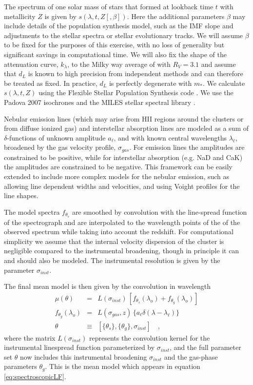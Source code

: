 \documentclass[iop,numberedappendix]{emulateapj}
\begin{document}
The spectrum of one solar mass of stars that formed at lookback time
$t$ with metallicity $Z$ is given by $s(\lambda, t, Z [, \beta])$.
Here the additional parameters $\beta$ may include details of the
population synthesis model, such as the IMF slope and adjustments to
the stellar spectra or stellar evolutionary tracks. We will assume
$\beta$ to be fixed for the purposes of this exercise, with no loss of
generality but significant savings in computational time.  We will
also fix the shape of the attenuation curve, $k_\lambda $, to the
Milky way average of \citet{CCM89} with $R_V=3.1$ and assume that
$d_L$ is known to high precision from independent methods and can
therefore be treated as fixed.  In practice, $d_L$ is perfectly
degenerate with $m_*$. We calculate $s(\lambda, t, Z)$ using the
Flexible Stellar Population Synthesis code \citep[FSPS][]{fsps}.  We
use the Padova 2007 isochrones \citep{girardi00, bertilli94, marigo07}
and the MILES stellar spectral library \citep{miles_I, miles_II,
miles_III}.

Nebular emission lines (which may arise from HII regions around the
clusters or from diffuse ionized gas) and interstellar absorption
lines are modeled as a sum of $\delta$-functions of unknown amplitude
$a_\ell$, and with known central wavelengths $\lambda_\ell$, broadened
by the gas velocity profile, $\sigma_{gas}$.  For emission lines the
amplitudes are constrained to be positive, while for interstellar
absorption (e.g. NaD and CaK) the amplitudes are constrained to be
negative. This framework can be easily extended to include more
complex models for the nebular emission, such as allowing line
dependent widths and velocities, and using Voight profiles for the
line shapes.

The model spectra $f_{\theta_s}$ are smoothed by convolution with
the line-spread function of the spectrograph and are interpolated to
the wavelength points of the of the observed spectrum while taking
into account the redshift. For computational simplicity we assume that
the internal velocity dispersion of the cluster is negligible compared
to the instrumental broadening, though in principle it can and should
also be modeled. The instrumental resolution is given by the parameter
$\sigma_{inst}$. 

The final mean model is then given by the convolution in wavelength
\begin{eqnarray}\label{eq:MeanModel} 
\mu(\theta) &  = & L(\sigma_{inst}) \, \left[ f_{\theta_s}(\lambda_o)
                   + f_{\theta_g}(\lambda_o) \right]\\
f_{\theta_g}(\lambda_o) & = & L(\sigma_{gas}, z) \,  \{a_\ell\delta(\lambda-\lambda_\ell)\}\\
\theta & \equiv & \left[ \{\theta_s\}, \{\theta_{g}\}, \sigma_{inst} \right]
\quad ,
\end{eqnarray}
where the matrix $L(\sigma_{inst})$ represents the convolution kernel
for the instrumental linespread function parameterized by
$\sigma_{inst}$,
and the full parameter set $\theta$ now includes
this instrumental broadening $\sigma_{inst}$ 
and the gas-phase parameters $\theta_g$.
This is the mean model which appears in equation
\ref{eq:spectroscopicLF}.
\end{document}
